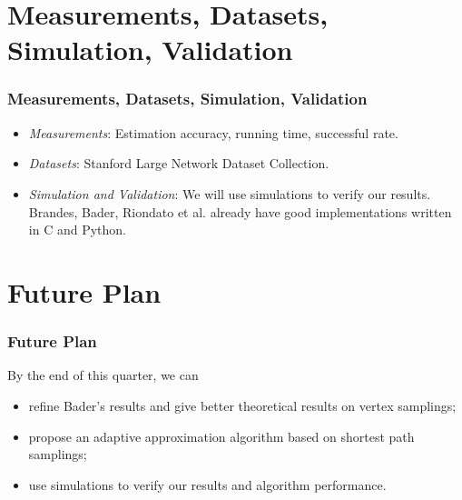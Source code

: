 \documentclass[12pt]{beamer}
\begin{document}
\section{Measurements, Datasets, Simulation, Validation}
\begin{frame}
	\frametitle{Measurements, Datasets, Simulation, Validation}
	\begin{itemize}
	\item {\it Measurements}: Estimation accuracy, running time, successful rate.
	\item {\it Datasets}: Stanford Large Network Dataset Collection.
	\item {\it Simulation and Validation}: We will use simulations to verify our results. Brandes, Bader, Riondato et al. already have good implementations written in C and Python.
	\end{itemize}
\end{frame}

\section{Future Plan}
\begin{frame}
	\frametitle{Future Plan}
	By the end of this quarter, we can
	\begin{itemize}
		\item refine Bader's results and give better theoretical results on vertex samplings;
		\item propose an adaptive approximation algorithm based on shortest path samplings;
		\item use simulations to verify our results and algorithm performance.
	\end{itemize}
\end{frame}
\end{document}
